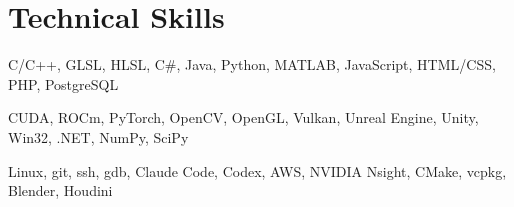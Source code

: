 \documentclass[letterpaper,11pt]{article}
\begin{document}
\section{Technical Skills}
    \small{\begin{description}[leftmargin=0.5in, itemindent=-0.25in, labelindent=0.5in, itemsep=-0.2em]
        \item[Languages] C/C++, GLSL, HLSL, C\#, Java, Python, MATLAB, JavaScript, HTML/CSS, PHP, PostgreSQL
        \item[Frameworks] CUDA, ROCm, PyTorch, OpenCV, OpenGL, Vulkan, Unreal Engine, Unity, Win32, .NET, NumPy, SciPy
        \item[Developer tools] Linux, git, ssh, gdb, Claude Code, Codex, AWS, NVIDIA Nsight, CMake, vcpkg, Blender, Houdini
    \end{description}}

\end{document}
